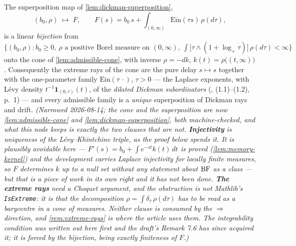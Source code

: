 \begin{proposition}\label{prop:extreme-rays}
The superposition map of \ref{lem:dickman-superposition},
\[
  (b_0, \rho) \;\mapsto\; F, \qquad
  F(s) = b_0\,s + \int_{(0,\infty)} \mathrm{Ein}(\tau s)\,\rho(d\tau),
\]
is a linear \emph{bijection} from
$\bigl\{(b_0, \rho) : b_0 \ge 0,\ \rho \text{ a positive Borel measure on } (0,\infty),\
\int \bigl[\tau \wedge (1 + \log_+ \tau)\bigr]\,\rho(d\tau) < \infty \bigr\}$
onto the cone of \ref{lem:admissible-cone}, with inverse $\rho = -dk$,
$k(t) = \rho\bigl((t,\infty)\bigr)$. Consequently the
extreme rays of the cone are the pure delay $s \mapsto s$ together with the one-parameter family
$\mathrm{Ein}(\tau\,\cdot)$, $\tau > 0$ --- the Laplace exponents, with L\'evy density
$t^{-1}\mathbf{1}_{(0,\tau)}(t)$, of the \emph{dilated Dickman subordinators}
(\sscite{caravenna2019dickman}, (1.1)--(1.2), p.~1) --- and every admissible family is a
\emph{unique} superposition of Dickman rays and drift.
\statusT\quad\emph{(Narrowed 2026-08-14; the cone and the superposition are now
\ref{lem:admissible-cone} and \ref{lem:dickman-superposition}, both machine-checked, and what
this node keeps is exactly the two clauses that are not.
\textbf{Injectivity} is uniqueness of the L\'evy--Khintchine triple,  as the proof
below spends it. It is plausibly avoidable here --- $F'(s) = b_0 + \int e^{-st}k(t)\,dt$ is
proved (\ref{lem:memory-kernel}) and the development carries Laplace injectivity for locally
finite measures, so $F$ determines $k$ up to a null set without any statement about $\mathrm{BF}$ as a
class --- but that is a piece of work in its own right and it has not been done.
\textbf{The extreme rays} need a Choquet argument, and the obstruction is not Mathlib's
\texttt{IsExtreme}: it is that the decomposition $\rho = \int \delta_\tau\,\rho(d\tau)$ has to be
read as a barycentre in a cone of measures. Neither clause is consumed by the
$\Rightarrow$ direction, and \ref{rem:extreme-rays} is where the article uses them.
The integrability condition was written out here first and the draft's Remark 7.6 has since
acquired it; it is forced by the bijection, being exactly finiteness of $F$.)}
\end{proposition}

